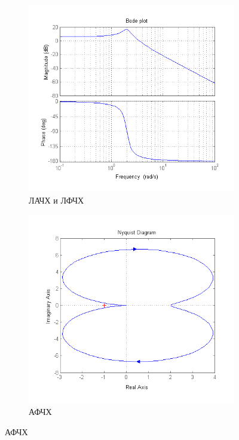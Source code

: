 \documentclass[a4paper, 11pt, russian]{article}
\begin{document}
    \begin{figure}[ht!]
        \centering
        \begin{subfigure}[h]{0.48\textwidth}
            \includegraphics[width = \textwidth]{oscillatoryLinkBode}
            \caption{ЛАЧХ и ЛФЧХ}
        \end{subfigure}
        \hfill
        \begin{subfigure}[h]{0.48\textwidth}
            \includegraphics[width = \textwidth]{oscillatoryLinkNyquist}
            \caption{АФЧХ}
        \end{subfigure}
        

\end{figure}
\end{document}
